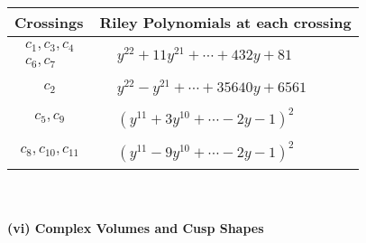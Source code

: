 \documentclass[1p]{elsarticle_modified}
\theoremstyle{definition}
\begin{document}
\begin{tabular}{m{50pt}|m{274pt}}
Crossings & \hspace{64pt}Riley Polynomials at each crossing \\
\hline $$\begin{aligned}c_{1},c_{3},c_{4}\\c_{6},c_{7}\end{aligned}$$&$\begin{aligned}
&y^{22}+11 y^{21}+\cdots+432 y+81
\end{aligned}$\\
\hline $$\begin{aligned}c_{2}\end{aligned}$$&$\begin{aligned}
&y^{22}- y^{21}+\cdots+35640 y+6561
\end{aligned}$\\
\hline $$\begin{aligned}c_{5},c_{9}\end{aligned}$$&$\begin{aligned}
&(y^{11}+3 y^{10}+\cdots-2 y-1)^{2}
\end{aligned}$\\
\hline $$\begin{aligned}c_{8},c_{10},c_{11}\end{aligned}$$&$\begin{aligned}
&(y^{11}-9 y^{10}+\cdots-2 y-1)^{2}
\end{aligned}$\\
\hline
\end{tabular}\\~\\
\newpage\flushleft \textbf{(vi) Complex Volumes and Cusp Shapes}
\end{document}
